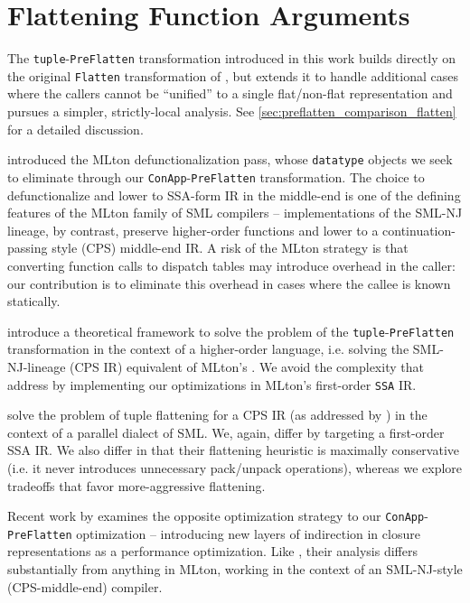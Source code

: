 \section{Flattening Function Arguments}

The \texttt{tuple}-\texttt{PreFlatten} transformation introduced in this work
builds directly on the original \texttt{Flatten} transformation of
\citet{flat-paper}, but extends it to handle additional cases where the callers cannot be
``unified'' to a single flat/non-flat representation and pursues a simpler,
strictly-local analysis. See
\cref{sec:preflatten_comparison_flatten} for a detailed discussion.

\citet{mlton-closure-paper} introduced the MLton defunctionalization pass,
whose \texttt{datatype} objects we seek to eliminate through
our \texttt{ConApp}-\texttt{PreFlatten} transformation. The choice to
defunctionalize and lower to SSA-form IR in the middle-end is one of the
defining features of the MLton family of SML compilers -- implementations of the
SML-NJ lineage, by contrast, preserve higher-order functions and lower to a
continuation-passing style (CPS) middle-end IR. A risk of the MLton strategy is
that converting function calls to dispatch tables may introduce overhead in the
caller: our contribution is to eliminate this overhead in cases where the callee
is known statically.

\citet{higher-order-flattening} introduce a theoretical framework to solve the
problem of the \texttt{tuple}-\texttt{PreFlatten} transformation in the context
of a higher-order language, i.e. solving the SML-NJ-lineage (CPS IR) equivalent
of MLton's \citet{flat-paper}. We avoid the complexity that
\citet{higher-order-flattening} address by implementing our optimizations in
MLton's first-order \texttt{SSA} IR.

\citet{manticore-arity-paper} solve the problem of tuple flattening for
a CPS IR (as addressed by \citet{higher-order-flattening}) in the context of a
parallel dialect of SML. We, again, differ by targeting a first-order SSA IR.
We also differ in that their flattening heuristic is maximally conservative
(i.e. it never introduces unnecessary pack/unpack operations), whereas we
explore tradeoffs that favor more-aggressive flattening.

Recent work by \citet{closure-sharing-paper} examines the opposite optimization
strategy to our \texttt{ConApp}-\texttt{PreFlatten} optimization -- introducing
new layers of indirection in closure representations as a performance
optimization. Like \citet{manticore-arity-paper}, their analysis differs
substantially from anything in MLton, working in the context of an SML-NJ-style
(CPS-middle-end) compiler.

